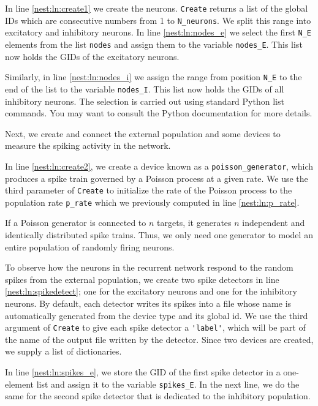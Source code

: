 \documentclass{article}
\begin{document}
In line \ref{nest:ln:create1} we create the neurons. 
\lstinline!Create! returns a list of the global IDs which
are consecutive numbers from 1 to \lstinline!N_neurons!. 
We split this range into excitatory and inhibitory neurons. In
line \ref{nest:ln:nodes_e} we select the first \lstinline!N_E!
elements from the list \lstinline!nodes! and assign them to the
variable \lstinline!nodes_E!. This list now holds the GIDs of the
excitatory neurons. 

Similarly, in line \ref{nest:ln:nodes_i} we assign the range from position
\lstinline!N_E! to the end of the list to the variable
\lstinline!nodes_I!. This list now holds the GIDs of all inhibitory
neurons. The selection is carried out using standard Python list commands. You
may want to consult the Python documentation for more details.

Next, we create and connect the external population and some devices
to measure the spiking activity in the network.

In line \ref{nest:ln:create2}, we create a device known as a
\lstinline!poisson_generator!, which produces a spike train governed
by a Poisson process at a given rate. We use the third parameter of
\lstinline!Create! to initialize the rate of the Poisson process to
the population rate \lstinline!p_rate!  which we previously computed
in line \ref{nest:ln:p_rate}.

If a Poisson generator is connected to $n$ targets, it generates $n$
independent and identically distributed spike trains. Thus, we only
need one generator to model an entire population of randomly firing
neurons.

 To observe how the neurons in the
recurrent network respond to the random spikes from the external
population, we create two spike detectors in line
\ref{nest:ln:spikedetect}; one for the excitatory neurons and one for the
inhibitory neurons. By default, each detector writes its spikes into a
file whose name is automatically generated from the device type and
its global id. We use
the third argument of \lstinline!Create! to give each spike detector a
\lstinline!'label'!, which will be part of the name of the output file written
by the detector. Since two devices are created, we supply a list
of dictionaries.

In line \ref{nest:ln:spikes_e}, we store the GID of the first spike
detector in a one-element list and assign it to the variable
\lstinline!spikes_E!. In the next line, we do the same for the second
spike detector that is dedicated to the inhibitory population.
\end{document}
